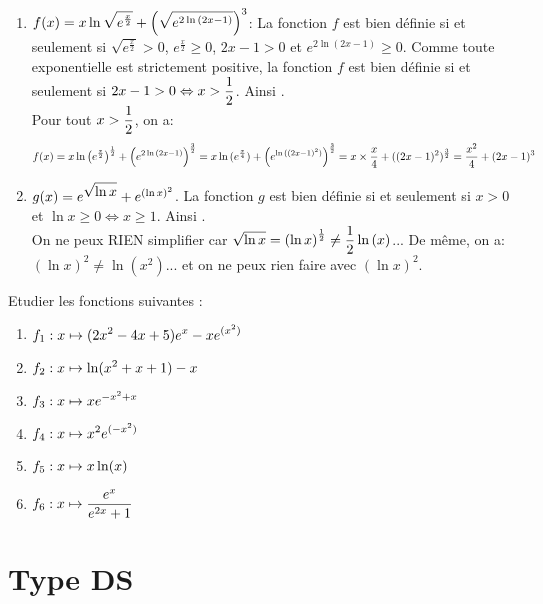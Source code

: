 \documentclass[a4paper, 11pt]{article}
\begin{document}
\begin{correction}  \;
\begin{enumerate}
 \item
$f(x)=x\ln{\displaystyle\sqrt{e^{\frac{x}{2}}}}+\left( \displaystyle\sqrt{e^{2\ln{(2x-1)}}} \right)^3$: La fonction $f$ est bien d\'efinie si et seulement si $\sqrt{e^{\frac{x}{2}}}>0$, $e^{\frac{x}{2}}\geq 0$, $2x-1>0$ et $e^{2\ln{(2x-1)}}\geq 0$. Comme toute exponentielle est strictement positive, la fonction $f$ est bien d\'efinie si et seulement si $2x-1>0\Leftrightarrow x>\displaystyle\frac{1}{2}$. Ainsi .\\
\noindent  Pour tout $x>\displaystyle\frac{1}{2}$, on a: 
$$f(x)=x\ln{  \left( e^{\frac{x}{2}} \right)^{\frac{1}{2}} } + \left( e^{2\ln{(2x-1)}}\right)^{\frac{3}{2}}= x\ln{( e^{\frac{x}{4}} )}  +  \left( e^{\ln{((2x-1)^2)}}\right)^{\frac{3}{2}}= x\times \displaystyle\frac{x}{4}+ ((2x-1)^2)^{\frac{3}{2}}= \displaystyle\frac{x^2}{4}+(2x-1)^3$$
\item 
$g(x)=e^{\displaystyle\sqrt{\ln{x}}}+e^{(\ln{x})^2}$. La fonction $g$ est bien d\'efinie si et seulement si $x>0$ et $\ln{x}\geq 0\Leftrightarrow x\geq 1$. Ainsi .\\
\noindent On ne peux RIEN simplifier car $\sqrt{\ln{x}}=\left( \ln{x} \right)^{\frac{1}{2}}\not= \displaystyle\frac{1}{2}\ln{(x)}$... De m\^{e}me, on a: $(\ln{x})^2\not= \ln{(x^2)}$... et on ne peux rien faire avec $(\ln{x})^2$.
\end{enumerate}
\end{correction}



\begin{exercice}
    Etudier les fonctions suivantes : 

    \begin{enumerate}
        \item $f_1 :\displaystyle x\mapsto (2x^2-4x+5)e^x-xe^{(x^2)} $
        \item $f_2 :\displaystyle x\mapsto \ln(x^2+x+1)-x$
        \item $f_3 :\displaystyle x\mapsto xe^{-x^2+x}$
        \item $f_4 :\displaystyle x\mapsto x^2e^{(-x^2)}$
        \item $f_5 :\displaystyle x\mapsto x\ln(x)$
        \item $f_6 :\displaystyle x\mapsto \frac{e^{x}}{e^{2x}+1}$
    \end{enumerate}
\end{exercice}


\section*{Type DS}
\end{document}
